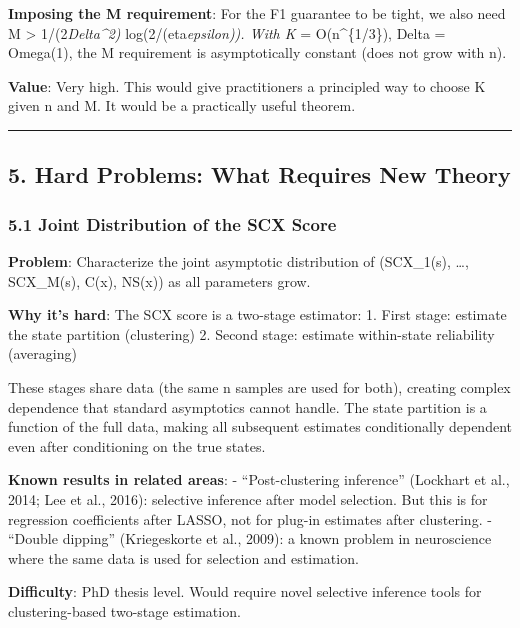 \documentclass[
  12pt,
]{ctexart}
\begin{document}
\textbf{Imposing the M requirement}: For the F1 guarantee to be tight,
we also need M \textgreater{} 1/(2\emph{Delta\^{}2) }
log(2/(eta\emph{epsilon)). With K} = O(n\^{}\{1/3\}), Delta = Omega(1),
the M requirement is asymptotically constant (does not grow with n).

\textbf{Value}: Very high. This would give practitioners a principled
way to choose K given n and M. It would be a practically useful theorem.

\begin{center}\rule{0.5\linewidth}{0.5pt}\end{center}

\subsection{5. Hard Problems: What Requires New
Theory}\label{hard-problems-what-requires-new-theory}

\subsubsection{5.1 Joint Distribution of the SCX
Score}\label{joint-distribution-of-the-scx-score}

\textbf{Problem}: Characterize the joint asymptotic distribution of
(SCX\_1(s), \ldots, SCX\_M(s), C(x), NS(x)) as all parameters grow.

\textbf{Why it's hard}: The SCX score is a two-stage estimator: 1. First
stage: estimate the state partition (clustering) 2. Second stage:
estimate within-state reliability (averaging)

These stages share data (the same n samples are used for both), creating
complex dependence that standard asymptotics cannot handle. The state
partition is a function of the full data, making all subsequent
estimates conditionally dependent even after conditioning on the true
states.

\textbf{Known results in related areas}: - ``Post-clustering inference''
(Lockhart et al., 2014; Lee et al., 2016): selective inference after
model selection. But this is for regression coefficients after LASSO,
not for plug-in estimates after clustering. - ``Double dipping''
(Kriegeskorte et al., 2009): a known problem in neuroscience where the
same data is used for selection and estimation.

\textbf{Difficulty}: PhD thesis level. Would require novel selective
inference tools for clustering-based two-stage estimation.
\end{document}
